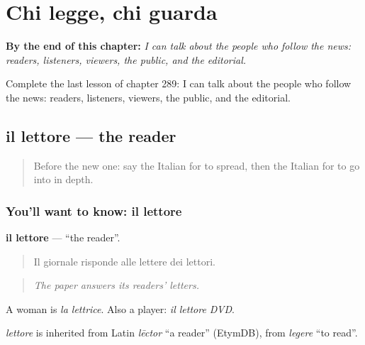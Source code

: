 
\chapter{Chi legge, chi guarda}
\label{ch:it-chi-legge-chi-guarda}

\begin{chapteropening}
\textbf{By the end of this chapter:} \emph{I can talk about the people who follow the news: readers, listeners, viewers, the public, and the editorial.}

Complete the last lesson of chapter 289: I can talk about the people who follow the news: readers, listeners, viewers, the public, and the editorial.
\end{chapteropening}

\section[il lettore]{il lettore — the reader}

\label{lesson:IT-C289-lettore}



\begin{quote}
Before the new one: say the Italian for to spread, then the Italian for to go into in depth.
\end{quote}

\subsection*{You'll want to know: il lettore}
\textbf{il lettore} — \textquotedblleft{}the reader\textquotedblright{}.

\begin{quote}
Il giornale risponde alle lettere dei lettori.
\end{quote}

\begin{quote}
\emph{The paper answers its readers' letters.}
\end{quote}

A woman is \emph{la lettrice}. Also a player: \emph{il lettore DVD}.

\begin{cousinweb}
\emph{lettore} is inherited from Latin \emph{lēctor} \textquotedblleft{}a reader\textquotedblright{} (EtymDB), from \emph{legere} \textquotedblleft{}to read\textquotedblright{}.
\end{cousinweb}

